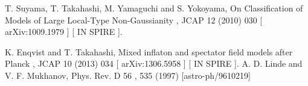\documentclass[amssymb,twocolumn,prd,nofootinbib,showpacs]{revtex4-1}
\begin{document}
\begin{thebibliography}{9}
T. Suyama, T. Takahashi, M. Yamaguchi and S. Yokoyama,
On Classification of Models of
Large Local-Type Non-Gaussianity
,
JCAP
12
(2010) 030
[
arXiv:1009.1979
] [
IN
SPIRE
].

 K. Enqvist and T. Takahashi,
Mixed inflaton and spectator field models after Planck
,
JCAP
10
(2013) 034 [
arXiv:1306.5958
] [
IN
SPIRE
].
 A. D. Linde and V. F. Mukhanov, Phys. Rev. D
56
, 535 (1997) [astro-ph/9610219]





\end{thebibliography}
\end{document}
